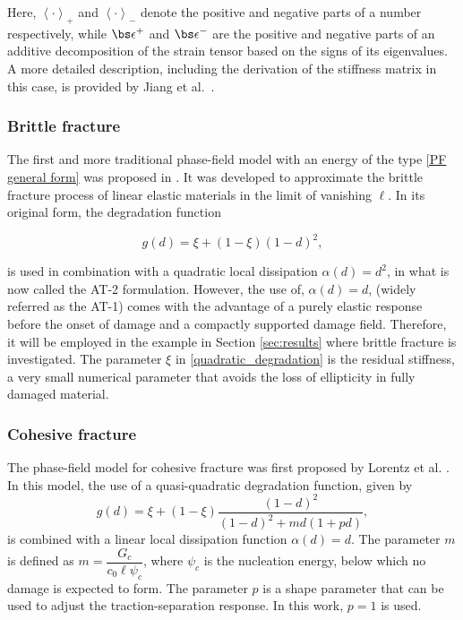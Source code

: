 Here, $\left< \cdot \right>_+$ and $\left< \cdot \right>_-$ denote the positive and negative parts of a number respectively, while $\bs\epsilon^+$ and $\bs\epsilon^-$ are the positive and negative parts of an additive decomposition of the strain tensor based on the signs of its eigenvalues. A more detailed description, including the derivation of the stiffness matrix in this case, is provided by Jiang et al.\ \cite{jiang2020three}.

\subsubsection{Brittle fracture}

The first and more traditional phase-field model with an energy of the type \eqref{PF general form} was proposed in \cite{bourdin2000numerical}. It was developed to approximate the brittle fracture process of linear elastic materials in the limit of vanishing $\ell$. In its original form, the degradation function 

\begin{equation}\label{quadratic_degradation}
    g(d) = \xi + (1-\xi)(1-d)^2,
\end{equation}

\noindent is used in combination with a quadratic local dissipation $\alpha(d) = d^2$, in what is now called the AT-2 formulation. However, the use of, $\alpha(d) = d$, (widely referred as the AT-1) comes with the advantage of a purely elastic response before the onset of damage and a compactly supported damage field. Therefore, it will be employed in the example in Section \ref{sec:results} where brittle fracture is investigated. The parameter $\xi$ in \eqref{quadratic_degradation} is the residual stiffness, a very small numerical parameter that avoids the loss of ellipticity in fully damaged material.

\subsubsection{Cohesive fracture}\label{cohesive_frac}

The phase-field model for cohesive fracture was first proposed by Lorentz et al. \cite{lorentz2011convergence, lorentz2011gradient}. In this model, the use of a quasi-quadratic degradation function, given by
\begin{equation}\label{cohesive_degradation}
    g(d) = \xi + (1-\xi)\dfrac{(1-d)^2}{(1-d)^2+md(1+pd)},
\end{equation}
is combined with a linear local dissipation function $\alpha(d) = d$.  The parameter $m$ is defined as $m = \dfrac{G_c}{c_0\ell\psi_c}$, where $\psi_c$ is the nucleation energy, below which no damage is expected to form.  The parameter $p$ is a shape parameter that can be used to adjust the traction-separation response.  In this work, $p=1$ is used.  